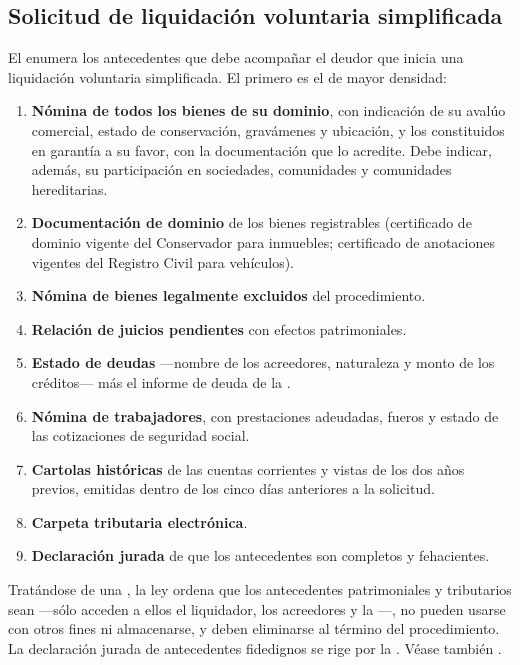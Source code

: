 \subsection{Solicitud de liquidación voluntaria simplificada}

El  enumera los antecedentes que debe acompañar el deudor que inicia una
liquidación voluntaria simplificada. El primero es el de mayor densidad:

\begin{enumerate}
  \item \textbf{Nómina de todos los bienes de su dominio}, con indicación de su avalúo
  comercial, estado de conservación, gravámenes y ubicación,  y los constituidos en garantía a su
  favor, con la documentación que lo acredite. Debe indicar, además, su participación en
  sociedades, comunidades y comunidades hereditarias.
  \item \textbf{Documentación de dominio} de los bienes registrables (certificado de dominio
  vigente del Conservador para inmuebles; certificado de anotaciones vigentes del Registro Civil
  para vehículos).
  \item \textbf{Nómina de bienes legalmente excluidos} del procedimiento.
  \item \textbf{Relación de juicios pendientes} con efectos patrimoniales.
  \item \textbf{Estado de deudas} ---nombre de los acreedores, naturaleza y monto de los
  créditos--- más el informe de deuda de la \cmf{}.
  \item \textbf{Nómina de trabajadores}, con prestaciones adeudadas, fueros y estado de las
  cotizaciones de seguridad social.
  \item \textbf{Cartolas históricas} de las cuentas corrientes y vistas de los dos años previos,
  emitidas dentro de los cinco días anteriores a la solicitud.
  \item \textbf{Carpeta tributaria electrónica}.
  \item \textbf{Declaración jurada} de que los antecedentes son completos y fehacientes.
\end{enumerate}

Tratándose de una , la ley ordena que los antecedentes patrimoniales y
tributarios sean  ---sólo acceden a ellos el liquidador, los acreedores y la
\superir{}---, no pueden usarse con otros fines ni almacenarse, y deben eliminarse al término del
procedimiento. La declaración jurada de antecedentes fidedignos se rige por la 
\citeyearpar{ncg-22}. Véase también \textcite{superir-faq-liquidacion-simplificada}.

